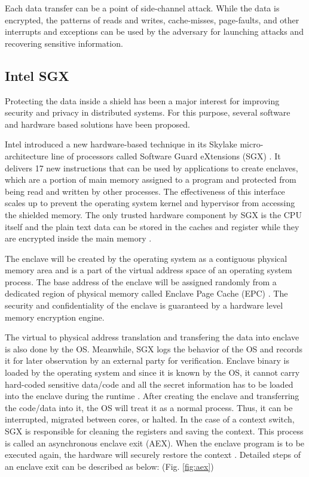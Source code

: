 Each data transfer can be a point of side-channel attack. While the data is encrypted, the patterns of reads and writes, cache-misses, page-faults, and other interrupts and exceptions can be used by the adversary for launching attacks and recovering sensitive information.

\subsection{Intel SGX}

Protecting the data inside a shield has been a major interest for improving security and privacy in distributed systems. For this purpose, several software and hardware based solutions have been proposed.

Intel introduced a new hardware-based technique in its Skylake micro-architecture \cite{skylake} line of processors called Software Guard eXtensions (SGX) \cite{sgx}. It delivers 17 new instructions that can be used by applications to create enclaves, which are a portion of main memory assigned to a program and protected from being read and written by other processes. The effectiveness of this interface scales up to prevent the operating system kernel and hypervisor from accessing the shielded memory. The only trusted hardware component by SGX is the CPU itself and the plain text data can be stored in the caches and register while they are encrypted inside the main memory \cite{brasser2017software}.

The enclave will be created by the operating system as a contiguous physical memory area and is a part of the virtual address space of an operating system process. The base address of the enclave will be assigned randomly from a dedicated region of physical memory called Enclave Page Cache (EPC) \cite{brasser2017software}. The security and confidentiality of the enclave is guaranteed by a hardware level memory encryption engine.

The virtual to physical address translation and transfering the data into enclave is also done by the OS. Meanwhile, SGX logs the behavior of the OS and records it for later observation by an external party for verification. Enclave binary is loaded by the operating system and since it is known by the OS, it cannot carry hard-coded sensitive data/code and all the secret information has to be loaded into the enclave during the runtime \cite{mge}. After creating the enclave and transferring the code/data into it, the OS will treat it as a normal process. Thus, it can be interrupted, migrated between cores, or halted. In the case of a context switch, SGX is responsible for cleaning the registers and saving the context. This process is called an asynchronous enclave exit (AEX). When the enclave program is to be executed again, the hardware will securely restore the context \cite{brasser2017software}. Detailed steps of an enclave exit can be described as below: \cite{tsgx} (Fig. \ref{fig:aex})

